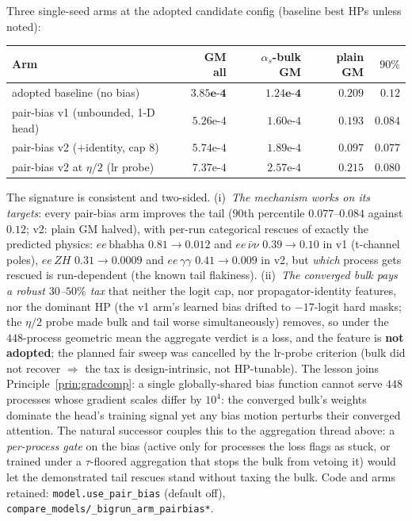\documentclass[11pt]{article}
\newcommand{\code}[1]{\texttt{#1}}
\begin{document}
Three single-seed arms at the adopted candidate config (baseline best HPs unless noted):

\begin{center}\begin{tabular}{@{}lrrrr@{}}
\toprule
Arm & GM all & $\alpha_s$-bulk GM & plain GM & $90\%$ \\
\midrule
adopted baseline (no bias)          & $\mathbf{3.85\text{e-}4}$ & $\mathbf{1.24\text{e-}4}$ & $0.209$ & $0.12$ \\
pair-bias v1 (unbounded, 1-D head)  & $5.26\text{e-}4$ & $1.60\text{e-}4$ & $0.193$ & $0.084$ \\
pair-bias v2 ($+$identity, cap 8)   & $5.74\text{e-}4$ & $1.89\text{e-}4$ & $\mathbf{0.097}$ & $\mathbf{0.077}$ \\
pair-bias v2 at $\eta/2$ (lr probe) & $7.37\text{e-}4$ & $2.57\text{e-}4$ & $0.215$ & $0.080$ \\
\bottomrule
\end{tabular}\end{center}

The signature is consistent and two-sided. (i)~\emph{The mechanism works on its targets}: every
pair-bias arm improves the tail ($90$th percentile $0.077$--$0.084$ against $0.12$; v2: plain GM
halved), with per-run categorical rescues of exactly the predicted physics:
$ee\,\text{bhabha}$ $0.81\!\to\!0.012$ and $ee\,\bar\nu\nu$ $0.39\!\to\!0.10$ in v1 (t-channel
poles), $ee\,ZH$ $0.31\!\to\!0.0009$ and $ee\,\gamma\gamma$ $0.41\!\to\!0.009$ in v2, but
\emph{which} process gets rescued is run-dependent (the known tail flakiness). (ii)~\emph{The
converged bulk pays a robust $30$--$50\%$ tax} that neither the logit cap, nor propagator-identity
features, nor the dominant HP (the v1 arm's learned bias drifted to $-17$-logit hard masks; the
$\eta/2$ probe made bulk and tail worse simultaneously) removes, so under the $448$-process
geometric mean the aggregate verdict is a loss, and the feature is \textbf{not adopted}; the
planned fair sweep was cancelled by the lr-probe criterion (bulk did not recover
$\Rightarrow$ the tax is design-intrinsic, not HP-tunable). The lesson joins
Principle~\ref{prin:gradcomp}: a single globally-shared bias function cannot serve $448$
processes whose gradient scales differ by $10^4$: the converged bulk's weights dominate the
head's training signal yet any bias motion perturbs their converged attention. The natural
successor couples this to the aggregation thread above: a \emph{per-process gate} on the bias
(active only for processes the loss flags as stuck, or trained under a $\tau$-floored
aggregation that stops the bulk from vetoing it) would let the demonstrated tail rescues stand
without taxing the bulk. Code and arms retained: \code{model.use\_pair\_bias} (default off),
\code{compare\_models/\_bigrun\_arm\_pairbias*}.
\end{document}
